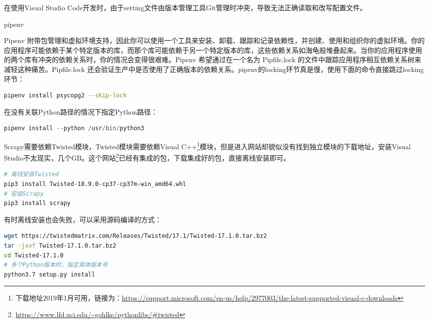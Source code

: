\documentclass[8pt]{book}
\makeatletter
\numberwithin{dummy}{section}
\theoremstyle{ocrenumbox}
\theoremstyle{blacknumex}
\theoremstyle{blacknumbox}
\theoremstyle{ocrenum}
\renewcommand{\subsection}{\@startsection {subsection}{2}{\z@}
	{-3ex \@plus -0.1ex \@minus -.4ex}
	{0.5ex \@plus.2ex }
	{\normalfont\sffamily\bfseries}}
\makeatother
\begin{document}
在使用Visual Studio Code开发时，由于setting文件由版本管理工具Git管理时冲突，导致无法正确读取和改写配置文件。

\subsection{pipenv}

Pipenv 附带包管理和虚拟环境支持，因此你可以使用一个工具来安装、卸载、跟踪和记录依赖性，并创建、使用和组织你的虚拟环境。你的应用程序可能依赖于某个特定版本的库，而那个库可能依赖于另一个特定版本的库，这些依赖关系如海龟般堆叠起来。当你的应用程序使用的两个库有冲突的依赖关系时，你的情况会变得很艰难。Pipenv 希望通过在一个名为 Pipfile.lock 的文件中跟踪应用程序相互依赖关系树来减轻这种痛苦。Pipfile.lock 还会验证生产中是否使用了正确版本的依赖关系。pipenv的locking环节真是慢，使用下面的命令直接跳过locking环节：

\begin{lstlisting}[language=Bash]
pipenv install psycopg2 --skip-lock
\end{lstlisting}

在没有关联Python路径的情况下指定Python路径：

\begin{lstlisting}[language=Python]
pipenv install --python /usr/bin/python3
\end{lstlisting}








Scrapy需要依赖Twisted模块，Twisted模块需要依赖Visual C++\footnote{下载地址2019年1月可用，链接为：\url{https://support.microsoft.com/en-us/help/2977003/the-latest-supported-visual-c-downloads}}模块，但是进入网站却貌似没有找到独立模块的下载地址，安装Visual Studio不太现实，几个GB。这个网站\footnote{\url{https://www.lfd.uci.edu/~gohlke/pythonlibs/\#twisted}}已经有集成的包，下载集成好的包，直接离线安装即可。

\begin{lstlisting}[language=Bash]
# 离线安装Twisted
pip3 install Twisted-18.9.0-cp37-cp37m-win_amd64.whl
# 安装Scrapy
pip3 install scrapy
\end{lstlisting}


有时离线安装也会失败，可以采用源码编译的方式：


\begin{lstlisting}[language=Bash]
wget https://twistedmatrix.com/Releases/Twisted/17.1/Twisted-17.1.0.tar.bz2
tar -jxvf Twisted-17.1.0.tar.bz2
cd Twisted-17.1.0
# 多个Python版本时，指定具体版本号
python3.7 setup.py install
\end{lstlisting}
\end{document}
